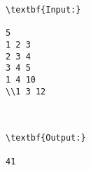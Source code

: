 \begin{verbatim}
\textbf{Input:}

5
1 2 3
2 3 4
3 4 5
1 4 10
\\1 3 12



\textbf{Output:}

41

\end{verbatim}